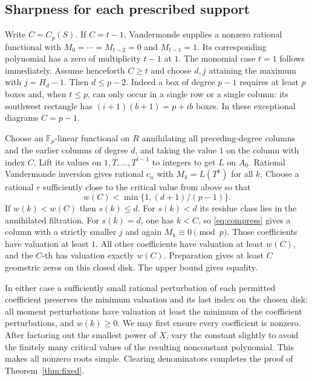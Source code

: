 \documentclass[11pt]{article}
\newcommand{\F}{\mathbb F}
\begin{document}
\subsection*{Sharpness for each prescribed support}
Write $C=C_p(S)$. If $C=t-1$, Vandermonde supplies a nonzero rational functional with $M_0=\cdots=M_{t-2}=0$ and $M_{t-1}=1$. Its corresponding polynomial has a zero of multiplicity $t-1$ at $1$. The monomial case $t=1$ follows immediately. Assume henceforth $C\ge t$ and choose $d,j$ attaining the maximum with $j=H_d-1$. Then $d\le p-2$. Indeed a box of degree $p-1$ requires at least $p$ boxes and, when $t\le p$, can only occur in a single row or a single column: its southwest rectangle has $(i+1)(b+1)=p+ib$ boxes. In these exceptional diagrams $C=p-1$.

Choose an $\F_p$-linear functional on $R$ annihilating all preceding-degree columns and the earlier columns of degree $d$, and taking the value $1$ on the column with index $C$. Lift its values on $1,T,\ldots,T^{t-1}$ to integers to get $L$ on $A_0$. Rational Vandermonde inversion gives rational $c_n$ with $M_k=L(T^k)$ for all $k$. Choose a rational $r$ sufficiently close to the critical value from above so that
\[
 w(C)<\min\{1,(d+1)/(p-1)\}.
\]
If $w(k)<w(C)$ then $s(k)\le d$. For $s(k)<d$ its residue class lies in the annihilated filtration. For $s(k)=d$, one has $k<C$, so \eqref{eq:compress} gives a column with a strictly smaller $j$ and again $M_k\equiv0\pmod p$. Those coefficients have valuation at least $1$. All other coefficients have valuation at least $w(C)$, and the $C$-th has valuation exactly $w(C)$. Preparation gives at least $C$ geometric zeros on this closed disk. The upper bound gives equality.

In either case a sufficiently small rational perturbation of each permitted coefficient preserves the minimum valuation and its last index on the chosen disk: all moment perturbations have valuation at least the minimum of the coefficient perturbations, and $w(k)\ge0$. We may first ensure every coefficient is nonzero. After factoring out the smallest power of $X$, vary the constant slightly to avoid the finitely many critical values of the resulting nonconstant polynomial. This makes all nonzero roots simple. Clearing denominators completes the proof of Theorem~\ref{thm:fixed}.
\end{document}
